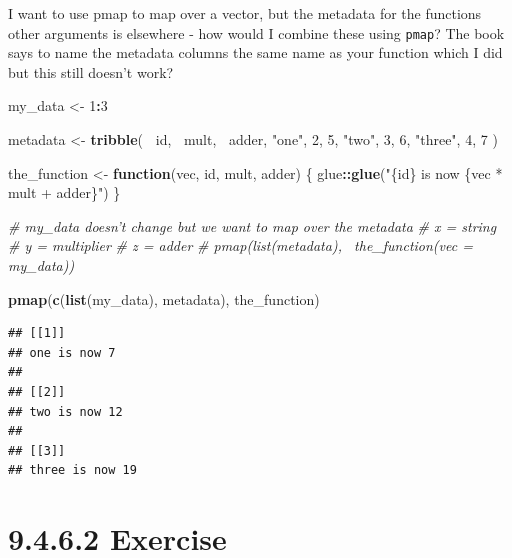 \documentclass[]{book}
\newenvironment{Shaded}{\begin{snugshade}}{\end{snugshade}}
\newcommand{\CommentTok}[1]{\textcolor[rgb]{0.56,0.35,0.01}{\textit{#1}}}
\newcommand{\ControlFlowTok}[1]{\textcolor[rgb]{0.13,0.29,0.53}{\textbf{#1}}}
\newcommand{\DecValTok}[1]{\textcolor[rgb]{0.00,0.00,0.81}{#1}}
\newcommand{\KeywordTok}[1]{\textcolor[rgb]{0.13,0.29,0.53}{\textbf{#1}}}
\newcommand{\NormalTok}[1]{#1}
\newcommand{\OperatorTok}[1]{\textcolor[rgb]{0.81,0.36,0.00}{\textbf{#1}}}
\newcommand{\StringTok}[1]{\textcolor[rgb]{0.31,0.60,0.02}{#1}}
\begin{document}
I want to use pmap to map over a vector, but the metadata for the functions other arguments is elsewhere - how would I combine these using \texttt{pmap}? The book says to name the metadata columns the same name as your function which I did but this still doesn't work?

\begin{Shaded}
\begin{Highlighting}[]
\NormalTok{my_data <-}\StringTok{ }\DecValTok{1}\OperatorTok{:}\DecValTok{3}

\NormalTok{metadata <-}\StringTok{ }\KeywordTok{tribble}\NormalTok{(}
  \OperatorTok{~}\NormalTok{id, }\OperatorTok{~}\NormalTok{mult, }\OperatorTok{~}\NormalTok{adder,}
  \StringTok{"one"}\NormalTok{,   }\DecValTok{2}\NormalTok{,      }\DecValTok{5}\NormalTok{,}
  \StringTok{"two"}\NormalTok{,   }\DecValTok{3}\NormalTok{,      }\DecValTok{6}\NormalTok{,}
  \StringTok{"three"}\NormalTok{, }\DecValTok{4}\NormalTok{,      }\DecValTok{7}
\NormalTok{)}

\NormalTok{the_function <-}\StringTok{ }\ControlFlowTok{function}\NormalTok{(vec, id, mult, adder) \{}
\NormalTok{  glue}\OperatorTok{::}\KeywordTok{glue}\NormalTok{(}\StringTok{"\{id\} is now \{vec * mult + adder\}"}\NormalTok{)}
\NormalTok{\}}

\CommentTok{# my_data doesn't change but we want to map over the metadata}
\CommentTok{# x = string}
\CommentTok{# y = multiplier}
\CommentTok{# z = adder}
\CommentTok{# pmap(list(metadata), ~the_function(vec = my_data))}
\end{Highlighting}
\end{Shaded}

\begin{Shaded}
\begin{Highlighting}[]
\KeywordTok{pmap}\NormalTok{(}\KeywordTok{c}\NormalTok{(}\KeywordTok{list}\NormalTok{(my_data), metadata), the_function)}
\end{Highlighting}
\end{Shaded}

\begin{verbatim}
## [[1]]
## one is now 7
## 
## [[2]]
## two is now 12
## 
## [[3]]
## three is now 19
\end{verbatim}

\hypertarget{exercise-10}{%
\section*{9.4.6.2 Exercise}\label{exercise-10}}
\end{document}
